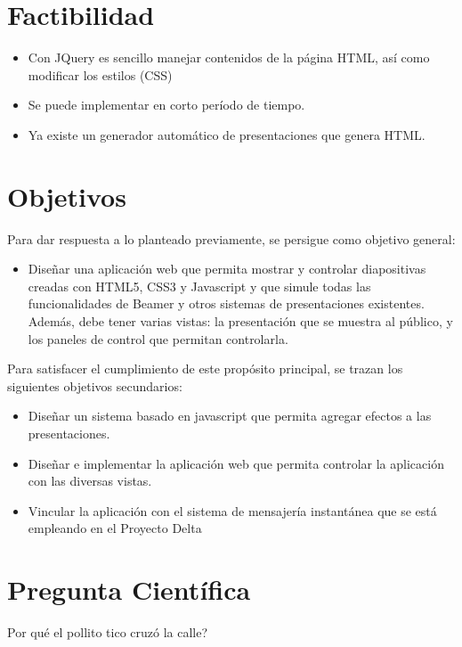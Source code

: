 \begin{introduction}
\section*{Factibilidad}

\begin{itemize}
	\item Con JQuery es sencillo manejar contenidos de la página HTML, así como modificar los estilos (CSS)
	\item Se puede implementar en corto período de tiempo.
	\item Ya existe un generador automático de presentaciones que genera HTML.
\end{itemize}



\section*{Objetivos}
 Para dar respuesta a lo planteado previamente, se persigue como objetivo general:
\begin{itemize}
	\item Diseñar una aplicación web que permita mostrar y controlar diapositivas creadas con HTML5, CSS3 y Javascript y que simule todas las funcionalidades de Beamer y otros sistemas de presentaciones existentes.  Además, debe tener varias vistas: la presentación que se muestra al público, y los paneles de control que permitan controlarla.
\end{itemize}
Para satisfacer el cumplimiento de este propósito principal, se trazan los siguientes objetivos secundarios:
\begin{itemize}
	\item Diseñar un sistema basado en javascript que permita agregar efectos a las presentaciones.
	\item Diseñar e implementar la aplicación web que permita controlar la aplicación con las diversas vistas.
	\item Vincular la aplicación con el sistema de mensajería instantánea que se está empleando en el Proyecto Delta
\end{itemize}


\section*{Pregunta Científica}

Por qué el pollito tico cruzó la calle?




\end{introduction}




